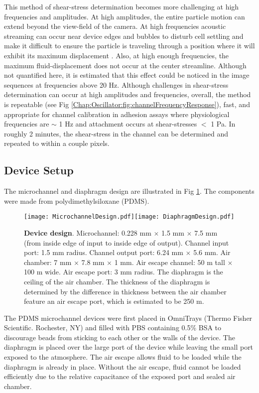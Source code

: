 This method of shear-stress determination becomes more challenging at high frequencies and amplitudes. At high amplitudes, the entire particle motion can extend beyond the view-field of the camera. At high frequencies acoustic streaming can occur near device edges and bubbles to disturb cell settling and make it difficult to ensure the particle is traveling through a position where it will exhibit its maximum displacement \cite{Chung:2008fk}. Also, at high enough frequencies, the maximum fluid-displacement does not occur at the center streamline. Although not quantified here, it is estimated that this effect could be noticed in the image sequences at frequencies above 20 Hz. Although challenges in shear-stress determination can occur at high amplitudes and frequencies, overall, the method is repeatable (see Fig \ref{Chap:Oscillator:fig:channelFrequencyResponse}), fast, and appropriate for channel calibration in adhesion assays where physiological frequencies are $\sim$ 1 Hz and attachment occurs at shear-stresses $<$ 1 Pa. In roughly 2 minutes, the shear-stress in the channel can be determined and repeated to within a couple pixels.

\subsection{Device Setup}\label{Chap:Oscillator:sec:methods:deviceSetup}
The microchannel and diaphragm design are illustrated in Fig \ref{Chap:Oscillator:fig:deviceDesign}. The components were made from polydimethylsiloxane (PDMS).

\begin{figure}[!ht]
\centering
\texttt{[image: MicrochannelDesign.pdf]}\hspace{0.5cm}\texttt{[image: DiaphragmDesign.pdf]}
\caption{\textbf{Device design}. Microchannel: 0.228 mm $\times$ 1.5 mm $\times$ 7.5 mm (from inside edge of input to inside edge of output). Channel input port: 1.5 mm radius. Channel output port: 6.24 mm $\times$ 5.6 mm. Air chamber: 7 mm $\times$ 7.8 mm $\times$ 1 mm. Air escape channel: 50 \textmu m tall $\times$ 100 \textmu m wide. Air escape port: 3 mm radius. The diaphragm is the ceiling of the air chamber. The thickness of the diaphragm is determined by the difference in thickness between the air chamber feature an air escape port, which is estimated to be 250 \textmu m.}
\label{Chap:Oscillator:fig:deviceDesign}
\end{figure}


The PDMS microchannel devices were first placed in OmniTrays (Thermo Fisher Scientific. Rochester, NY) and filled with PBS containing 0.5\% BSA to discourage beads from sticking to each other or the walls of the device. The diaphragm is placed over the large port of the device while leaving the small port exposed to the atmosphere. The air escape allows fluid to be loaded while the diaphragm is already in place. Without the air escape, fluid cannot be loaded efficiently due to the relative capacitance of the exposed port and sealed air chamber.

